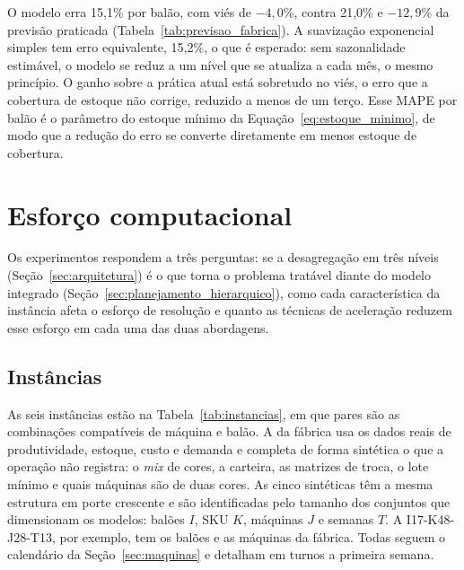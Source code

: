 \documentclass[
    12pt,
    openright,
    oneside,
    a4paper,
    fleqn,
    chapter=TITLE,
    section=TITLE,
    english,
    brazil
]{abntex2}
\begin{document}
O modelo erra 15,1\% por balão, com viés de $-4{,}0$\%, contra 21,0\% e $-12{,}9$\% da previsão praticada (Tabela~\ref{tab:previsao_fabrica}). A suavização exponencial simples tem erro equivalente, 15,2\%, o que é esperado: sem sazonalidade estimável, o modelo se reduz a um nível que se atualiza a cada mês, o mesmo princípio. O ganho sobre a prática atual está sobretudo no viés, o erro que a cobertura de estoque não corrige, reduzido a menos de um terço. Esse MAPE por balão é o parâmetro do estoque mínimo da Equação~\eqref{eq:estoque_minimo}, de modo que a redução do erro se converte diretamente em menos estoque de cobertura.

\section{Esforço computacional}
\label{sec:resultado_esforco}

Os experimentos respondem a três perguntas: se a desagregação em três níveis (Seção~\ref{sec:arquitetura}) é o que torna o problema tratável diante do modelo integrado (Seção~\ref{sec:planejamento_hierarquico}), como cada característica da instância afeta o esforço de resolução e quanto as técnicas de aceleração reduzem esse esforço em cada uma das duas abordagens.

\subsection{Instâncias}

As seis instâncias estão na Tabela~\ref{tab:instancias}, em que pares são as combinações compatíveis de máquina e balão. A da fábrica usa os dados reais de produtividade, estoque, custo e demanda e completa de forma sintética o que a operação não registra: o \textit{mix} de cores, a carteira, as matrizes de troca, o lote mínimo e quais máquinas são de duas cores. As cinco sintéticas têm a mesma estrutura em porte crescente e são identificadas pelo tamanho dos conjuntos que dimensionam os modelos: balões $I$, SKU $K$, máquinas $J$ e semanas $T$. A I17-K48-J28-T13, por exemplo, tem os balões e as máquinas da fábrica. Todas seguem o calendário da Seção~\ref{sec:maquinas} e detalham em turnos a primeira semana.

\begin{table}[htbp]
\centering
\small
\caption{Porte das instâncias dos experimentos.}
\label{tab:instancias}

\end{table}
\end{document}
